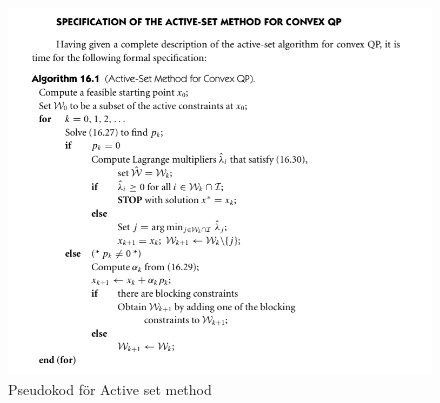 \begin{figure}[h]
\center
\includegraphics[scale=0.45]{grafik/algoritm.png}
\caption{Pseudokod för Active set method}
\endcenter
\end{figure}
